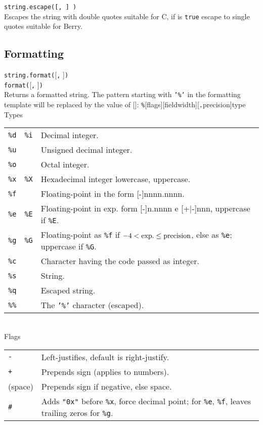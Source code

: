 \hangpar \texttt{string.escape(}\texttt{[, }\texttt{] )}\\
Escapes the string with double quotes suitable for C, if  is \texttt{true} escape to single quotes suitable for Berry.

\subsection*{Formatting}

\hangpartwo \texttt{string.format(}[\texttt{,} ]\texttt{)}\\
\texttt{format(}[\texttt{,} ]\texttt{)}\\
Returns a formatted string. The pattern starting with \texttt{'\%'} in the formatting template  will be replaced by the value of []: \texttt{\%}[\textsf{flags}][\textsf{fieldwidth}][\texttt{.}\textsf{precision}]\textsf{type}\\

\hangpar \textsf{Types}\\
\begin{tabular}{@{}llp{}}
    \texttt{\%d} & \texttt{\%i} & Decimal integer. \\
    \texttt{\%u} & & Unsigned decimal integer. \\
    \texttt{\%o} & & Octal integer. \\
    \texttt{\%x} & \texttt{\%X} & Hexadecimal integer lowercase, uppercase. \\
    \texttt{\%f} & & Floating-point in the form [-]nnnn.nnnn. \\
    \texttt{\%e} & \texttt{\%E} & Floating-point in exp. form [-]n.nnnn e [+|-]nnn,
    uppercase if \texttt{\%E}. \\
    \texttt{\%g} & \texttt{\%G} & Floating-point as \texttt{\%f} if $-4<\rm{exp.}\leq precision$, else as \texttt{\%e}; uppercase if \texttt{\%G}. \\
    \texttt{\%c} & & Character having the code passed as integer. \\
    \texttt{\%s} & & String. \\
    \texttt{\%q} & & Escaped string. \\
    \texttt{\%\%} & & The \texttt{'\%'} character (escaped). \\
\end{tabular}\\

\hangpar \textsf{Flags}\\
\begin{tabular}{@{}lp{}}
\texttt{-} & Left-justifies, default is right-justify. \\
\texttt{+} & Prepends sign (applies to numbers). \\
(space) & Prepends sign if negative, else space. \\
\texttt{\#} & Adds \texttt{"0x"} before \texttt{\%x}, force decimal point; for \texttt{\%e}, \texttt{\%f}, leaves trailing zeros for \texttt{\%g}. \\
\end{tabular}\\

